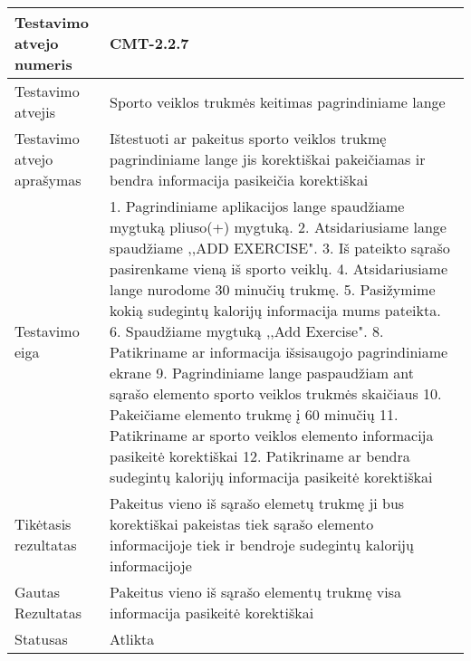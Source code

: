 \documentclass[oneside]{VUMIFPSkursinis}
\begin{document}
\begin{center}
    \begin{tabular}{ |p{5cm}|p{13cm}|}
    \hline
        Testavimo atvejo numeris & CMT-2.2.7  \\ \hline
        Testavimo atvejis & Sporto veiklos trukmės keitimas pagrindiniame lange \\ \hline
        Testavimo atvejo aprašymas & Ištestuoti ar pakeitus sporto veiklos trukmę pagrindiniame lange jis korektiškai pakeičiamas ir bendra informacija pasikeičia korektiškai \\ \hline
        Testavimo eiga &   1. Pagrindiniame aplikacijos lange spaudžiame mygtuką pliuso(+) mygtuką. 
				2. Atsidariusiame lange spaudžiame  ,,ADD EXERCISE". 
				3. Iš pateikto sąrašo pasirenkame vieną iš sporto veiklų. 
				4. Atsidariusiame lange nurodome 30 minučių trukmę.
				5. Pasižymime kokią sudegintų kalorijų informacija mums pateikta. 
				6. Spaudžiame mygtuką ,,Add Exercise".
				8. Patikriname ar informacija išsisaugojo pagrindiniame ekrane 
				9. Pagrindiniame lange paspaudžiam ant sąrašo elemento sporto veiklos trukmės skaičiaus
				10. Pakeičiame elemento trukmę į 60 minučių
				11. Patikriname ar sporto veiklos elemento informacija pasikeitė korektiškai
				12. Patikriname ar bendra sudegintų kalorijų informacija pasikeitė korektiškai\\ \hline
        Tikėtasis rezultatas &  Pakeitus vieno iš sąrašo elemetų trukmę ji bus korektiškai pakeistas tiek sąrašo elemento informacijoje tiek ir bendroje sudegintų kalorijų informacijoje \\ \hline
        Gautas Rezultatas & Pakeitus vieno iš sąrašo elementų trukmę visa informacija pasikeitė korektiškai \\ \hline
        Statusas &  Atlikta\\ \hline
    \hline
    \end{tabular}
\end{center}

\iffalse XXXXXXXXXXXXXXXXXXXXXXXXXXXXXXXXXXXXXXXXXXXXXXXXXXXXXXXXXXXXXXXXXXXXXXXXXXXXXXXXXXXXXXXXXXXXXXXXXXXXXXXXXXXXXXXXXXXXXXXXXXXXXXXXXXXXXXX \fi
\end{document}
